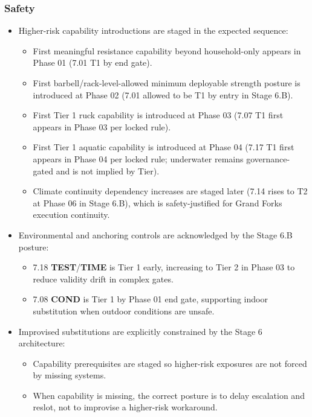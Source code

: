 \documentclass[10pt]{article}
\begin{document}
\subsubsection*{Safety}

\begin{itemize}
\item Higher-risk capability introductions are staged in the expected sequence:
  \begin{itemize}
  \item First meaningful resistance capability beyond household-only appears in Phase 01 (7.01 T1 by end gate).
  \item First barbell/rack-level-allowed minimum deployable strength posture is introduced at Phase 02 (7.01 allowed to be T1 by entry in Stage 6.B).
  \item First Tier 1 ruck capability is introduced at Phase 03 (7.07 T1 first appears in Phase 03 per locked rule).
  \item First Tier 1 aquatic capability is introduced at Phase 04 (7.17 T1 first appears in Phase 04 per locked rule; underwater remains governance-gated and is not implied by Tier).
  \item Climate continuity dependency increases are staged later (7.14 rises to T2 at Phase 06 in Stage 6.B), which is safety-justified for Grand Forks execution continuity.
  \end{itemize}
\item Environmental and anchoring controls are acknowledged by the Stage 6.B posture:
  \begin{itemize}
  \item 7.18 \textbf{TEST}/\textbf{TIME} is Tier 1 early, increasing to Tier 2 in Phase 03 to reduce validity drift in complex gates.
  \item 7.08 \textbf{COND} is Tier 1 by Phase 01 end gate, supporting indoor substitution when outdoor conditions are unsafe.
  \end{itemize}
\item Improvised substitutions are explicitly constrained by the Stage 6 architecture:
  \begin{itemize}
  \item Capability prerequisites are staged so higher-risk exposures are not forced by missing systems.
  \item When capability is missing, the correct posture is to delay escalation and reslot, not to improvise a higher-risk workaround.
  \end{itemize}
\end{itemize}
\end{document}
